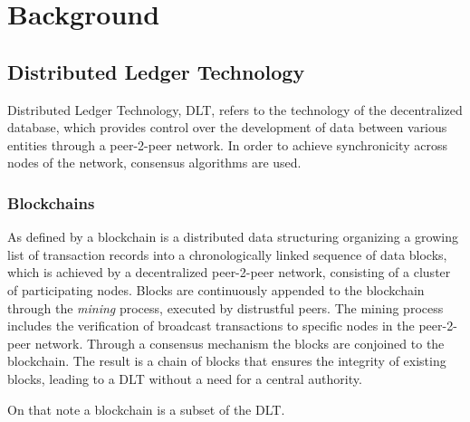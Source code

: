 \chapter{Background}
\label{chap:Background}


\section{Distributed Ledger Technology} %
\label{sec:Distributed Ledger Technology}

Distributed Ledger Technology, DLT, refers to the technology of the decentralized database, which provides control over
the development of data between various entities through a peer-2-peer network. In order to achieve synchronicity across
nodes of the network, consensus algorithms are used.

\subsection{Blockchains} %
\label{sub:Blockchains}
As defined by \cite{diam-iot-2020} a blockchain is a distributed data structuring organizing a growing list of
transaction records into a chronologically linked sequence of data blocks, which is achieved by a decentralized
peer-2-peer network, consisting of a cluster of participating nodes. Blocks are continuously appended to the blockchain
through the \textit{mining} process, executed by distrustful peers. The mining process includes the verification of
broadcast transactions to specific nodes in the peer-2-peer network. Through a consensus mechanism the blocks are
conjoined to the blockchain. The result is a chain of blocks that ensures the integrity of existing blocks, leading to a
DLT without a need for a central authority.

On that note a blockchain is a subset of the DLT. \cite{diam-iot-2020}

